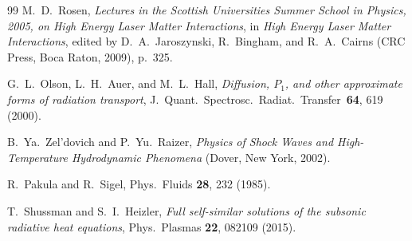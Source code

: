\documentclass[prl, twocolumn, superscriptaddress, amsmath, amssymb, reprint]{revtex4-2}
\begin{document}
\begin{thebibliography}{99}
M.~D.~Rosen,
\textit{Lectures in the Scottish Universities Summer School in Physics, 2005, on High Energy Laser Matter Interactions},
in \textit{High Energy Laser Matter Interactions}, edited by D.~A.~Jaroszynski, R.~Bingham, and R.~A.~Cairns
(CRC Press, Boca Raton, 2009), p.~325.

G.~L.~Olson, L.~H.~Auer, and M.~L.~Hall,
\textit{Diffusion, $P_1$, and other approximate forms of radiation transport},
J.~Quant.~Spectrosc.~Radiat.~Transfer~\textbf{64}, 619 (2000).

B.~Ya.~Zel'dovich and P.~Yu.~Raizer,
\textit{Physics of Shock Waves and High-Temperature Hydrodynamic Phenomena}
(Dover, New York, 2002).

R.~Pakula and R.~Sigel,
Phys.\ Fluids \textbf{28}, 232 (1985).



T.~Shussman and S.~I.~Heizler,
\textit{Full self-similar solutions of the subsonic radiative heat equations},
Phys.\ Plasmas \textbf{22}, 082109 (2015).

\end{thebibliography}
\end{document}
